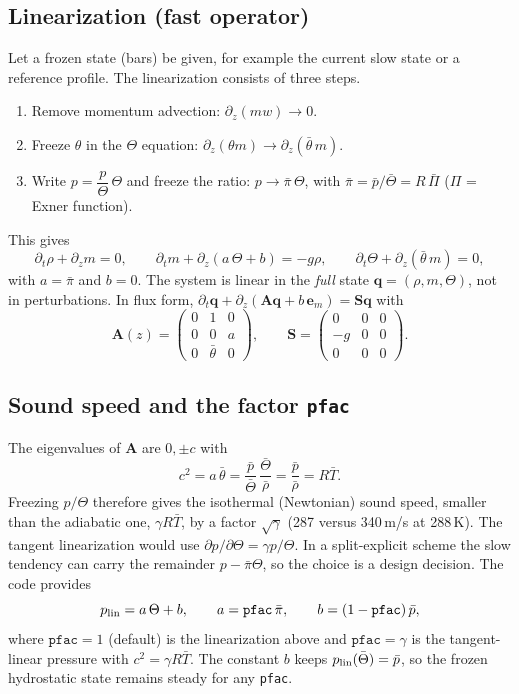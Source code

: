 \documentclass[11pt,a4paper]{article}
\newcommand{\q}{\bm q}
\newcommand{\thb}{\bar\theta}
\newcommand{\pib}{\bar\pi}
\begin{document}
\subsection{Linearization (fast operator)}
Let a frozen state (bars) be given, for example the current slow state or a reference profile.
The linearization consists of three steps.
\begin{enumerate}
\item Remove momentum advection: $\partial_z(mw)\to0$.
\item Freeze $\theta$ in the $\Theta$ equation: $\partial_z(\theta m)\to\partial_z(\thb\,m)$.
\item Write $p=\dfrac{p}{\Theta}\,\Theta$ and freeze the ratio:
      $p\to\pib\,\Theta$, with $\pib=\bar p/\bar\Theta = R\,\bar\Pi$ ($\Pi$ = Exner function).
\end{enumerate}
This gives
\begin{equation}\label{eq:fast}
\boxed{\;
\partial_t\rho+\partial_z m=0,\qquad
\partial_t m+\partial_z(a\,\Theta+b)=-g\rho,\qquad
\partial_t\Theta+\partial_z(\thb\,m)=0,\;}
\end{equation}
with $a=\pib$ and $b=0$. The system is linear in the \emph{full} state $\q=(\rho,m,\Theta)$,
not in perturbations. In flux form,
$\partial_t\q+\partial_z(\bm A\q+b\,\bm e_m)=\bm S\q$ with
\begin{equation}
\bm A(z)=\begin{pmatrix}0&1&0\\0&0&a\\0&\thb&0\end{pmatrix},\qquad
\bm S=\begin{pmatrix}0&0&0\\-g&0&0\\0&0&0\end{pmatrix}.
\end{equation}

\subsection{Sound speed and the factor \texttt{pfac}}
The eigenvalues of $\bm A$ are $0,\pm c$ with
\begin{equation}
c^2 = a\,\thb = \frac{\bar p}{\bar\Theta}\,\frac{\bar\Theta}{\bar\rho}=\frac{\bar p}{\bar\rho}=R\bar T .
\end{equation}
Freezing $p/\Theta$ therefore gives the isothermal (Newtonian) sound speed, smaller than the
adiabatic one, $\gamma R\bar T$, by a factor $\sqrt\gamma$ (287 versus 340\,m/s at 288\,K).
The tangent linearization would use $\partial p/\partial\Theta=\gamma p/\Theta$. In a
split-explicit scheme the slow tendency can carry the remainder $p-\pib\Theta$, so the
choice is a design decision. The code provides
\begin{equation}
p_{\rm lin}= a\,\Theta + b,\qquad a=\texttt{pfac}\,\pib,\qquad b=(1-\texttt{pfac})\,\bar p,
\end{equation}
where $\texttt{pfac}=1$ (default) is the linearization above and $\texttt{pfac}=\gamma$ is the
tangent-linear pressure with $c^2=\gamma R\bar T$. The constant $b$ keeps $p_{\rm lin}(\bar\Theta)=\bar p$,
so the frozen hydrostatic state remains steady for any \texttt{pfac}.
\end{document}
